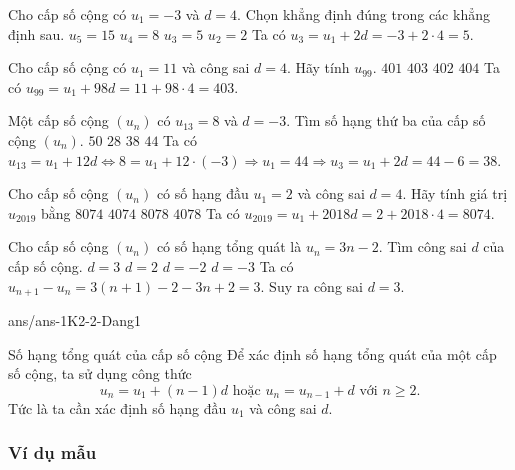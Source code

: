 \begin{ex}%
Cho cấp số cộng có $ u_1=-3 $ và $ d=4 $. Chọn khẳng định đúng trong các khẳng định sau.
\choice
{$ u_5=15 $}
{$ u_4=8 $}
{\True $ u_3=5 $}
{$ u_2=2 $}
\loigiai
{
	Ta có $ u_3=u_1+2d=-3+2\cdot4=5 $.
}
\end{ex}
\begin{ex}%
Cho cấp số cộng có $ u_1=11 $ và công sai $ d=4 $. Hãy tính $ u_{99} $.
\choice
{$ 401 $}
{\True $ 403 $}
{$ 402 $}
{$ 404 $}
\loigiai
{
	Ta có $ u_{99}=u_1+98d=11+98\cdot4=403 $.
}
\end{ex}
\begin{ex}%
Một cấp số cộng $ (u_n) $ có $ u_{13}=8 $ và $ d=-3 $. Tìm số hạng thứ ba của cấp số cộng $ (u_n) $.
\choice
{$ 50 $}
{$ 28 $}
{\True $ 38 $}
{$ 44 $}
\loigiai
{
	Ta có $ u_{13}=u_1+12d \Leftrightarrow 8=u_1+12\cdot(-3)\Rightarrow u_1=44 \Rightarrow u_{3}=u_1+2d=44-6=38$.
}
\end{ex}
\begin{ex}%
Cho cấp số cộng $(u_n) $ có số hạng đầu $ u_1=2 $ và công sai $ d=4 $. Hãy tính giá trị $ u_{2019} $ bằng
\choice
{\True $ 8074 $}
{$ 4074 $}
{$ 8078 $}
{$ 4078 $}
\loigiai
{
	Ta có $ u_{2019}=u_1+2018d=2+2018\cdot 4=8074 $.
}
\end{ex}
\begin{ex}%
Cho cấp số cộng $ (u_n) $ có số hạng tổng quát là $ u_n=3n-2 $. Tìm công sai $ d $ của cấp số cộng.
\choice
{\True $ d=3 $}
{$ d=2 $}
{$ d=-2 $}
{$ d=-3 $}
\loigiai
{
	Ta có $ u_{n+1}-u_n=3(n+1)-2-3n+2=3 $. Suy ra công sai $ d=3 $.
}
\end{ex}
\begin{indapan}{10}
{ans/ans-1K2-2-Dang1}
\end{indapan}
\begin{dang}
	{Số hạng tổng quát của cấp số cộng}
	Để xác định số hạng tổng quát của một cấp số cộng, ta sử dụng công thức
	\[
	u_n= u_1+(n-1)d \text{ hoặc } u_n= u_{n-1}+d \text{ với } n\ge 2.
	\]
	Tức là ta cần xác định số hạng đầu $u_1$ và công sai $d$.
\end{dang}

\subsubsection{Ví dụ mẫu}

